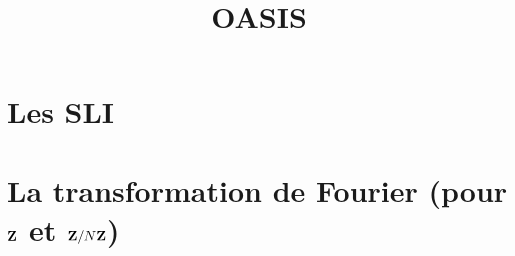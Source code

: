 \documentclass[a4paper,9pt]{article}
\title{\vspace{-1.2cm} OASIS}
\date{}
\theoremstyle{persoth}%
\theoremstyle{persodef}
\theoremstyle{remark}
\begin{document}
\maketitle

\vspace{-1.5cm}

\section{Les SLI}

	

\section{La transformation de Fourier (pour $\mathbf{Z}$ et $\mathbf{Z} / N\mathbf{Z}$)}

	
\end{document}
